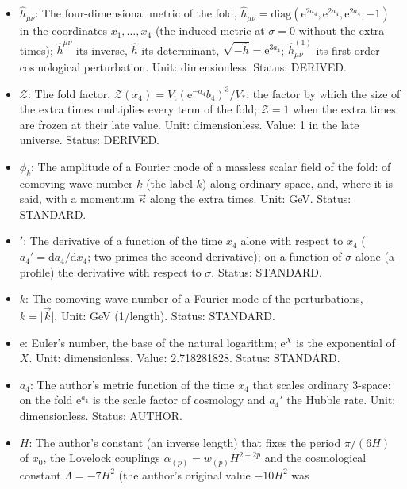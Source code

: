 \documentclass[
  10pt,
]{article}
\providecommand{\tightlist}{%
  \setlength{\itemsep}{0pt}\setlength{\parskip}{0pt}}
\begin{document}
\begin{itemize}
\tightlist
\item
  \(\hat h_{\mu\nu}\): The four-dimensional metric of the fold,
  \(\hat h_{\mu\nu} = \mathrm{diag}(\mathrm{e}^{2a_4}, \mathrm{e}^{2a_4}, \mathrm{e}^{2a_4}, -1)\)
  in the coordinates \(x_1, \dots, x_4\) (the induced metric at
  \(\sigma = 0\) without the extra times); \(\hat h^{\mu\nu}\) its
  inverse, \(\hat h\) its determinant,
  \(\sqrt{-\hat h} = \mathrm{e}^{3a_4}\); \(\hat h^{(1)}_{\mu\nu}\) its
  first-order cosmological perturbation. Unit: dimensionless. Status:
  DERIVED.
\item
  \(\mathcal{Z}\): The fold factor,
  \(\mathcal{Z}(x_4) = V_{\mathrm{t}}(\mathrm{e}^{-a_4}b_4)^3/V_*\): the
  factor by which the size of the extra times multiplies every term of
  the fold; \(\mathcal{Z} = 1\) when the extra times are frozen at their
  late value. Unit: dimensionless. Value: 1 in the late universe.
  Status: DERIVED.
\item
  \(\phi_k\): The amplitude of a Fourier mode of a massless scalar field
  of the fold: of comoving wave number \(k\) (the label \(k\)) along
  ordinary space, and, where it is said, with a momentum \(\vec\kappa\)
  along the extra times. Unit: GeV. Status: STANDARD.
\item
  \({}'\): The derivative of a function of the time \(x_4\) alone with
  respect to \(x_4\) (\(a_4' = \mathrm{d}a_4/\mathrm{d}x_4\); two primes
  the second derivative); on a function of \(\sigma\) alone (a profile)
  the derivative with respect to \(\sigma\). Status: STANDARD.
\item
  \(k\): The comoving wave number of a Fourier mode of the
  perturbations, \(k = \lvert\vec k\rvert\). Unit: GeV (1/length).
  Status: STANDARD.
\item
  \(\mathrm{e}\): Euler's number, the base of the natural logarithm;
  \(\mathrm{e}^{X}\) is the exponential of \(X\). Unit: dimensionless.
  Value: 2.718281828. Status: STANDARD.
\item
  \(a_4\): The author's metric function of the time \(x_4\) that scales
  ordinary 3-space: on the fold \(\mathrm{e}^{a_4}\) is the scale factor
  of cosmology and \(a_4'\) the Hubble rate. Unit: dimensionless.
  Status: AUTHOR.
\item
  \(H\): The author's constant (an inverse length) that fixes the period
  \(\pi/(6H)\) of \(x_0\), the Lovelock couplings
  \(\alpha_{(p)} = w_{(p)}H^{2-2p}\) and the cosmological constant
  \(\Lambda = -7H^2\) (the author's original value \(-10H^2\) was

\end{itemize}
\end{document}
